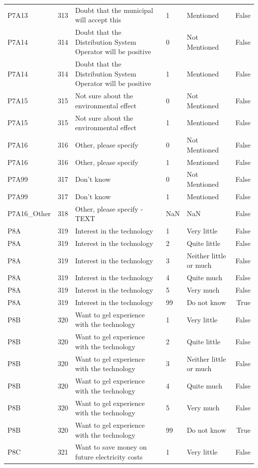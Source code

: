 \begin{tabular}{lrlllr}
P7A13 & 313 & Doubt that the municipal will accept this & 1 & Mentioned & False \\
P7A14 & 314 & Doubt that the Distribution System Operator will be positive & 0 & Not Mentioned & False \\
P7A14 & 314 & Doubt that the Distribution System Operator will be positive & 1 & Mentioned & False \\
P7A15 & 315 & Not sure about the environmental effect & 0 & Not Mentioned & False \\
P7A15 & 315 & Not sure about the environmental effect & 1 & Mentioned & False \\
P7A16 & 316 & Other, please specify & 0 & Not Mentioned & False \\
P7A16 & 316 & Other, please specify & 1 & Mentioned & False \\
P7A99 & 317 & Don’t know & 0 & Not Mentioned & False \\
P7A99 & 317 & Don’t know & 1 & Mentioned & False \\
P7A16_Other & 318 & Other, please specify - TEXT & NaN & NaN & False \\
P8A & 319 & Interest in the technology & 1 & Very little & False \\
P8A & 319 & Interest in the technology & 2 & Quite little & False \\
P8A & 319 & Interest in the technology & 3 & Neither little or much & False \\
P8A & 319 & Interest in the technology & 4 & Quite much & False \\
P8A & 319 & Interest in the technology & 5 & Very much & False \\
P8A & 319 & Interest in the technology & 99 & Do not know & True \\
P8B & 320 & Want to gel experience with the technology & 1 & Very little & False \\
P8B & 320 & Want to gel experience with the technology & 2 & Quite little & False \\
P8B & 320 & Want to gel experience with the technology & 3 & Neither little or much & False \\
P8B & 320 & Want to gel experience with the technology & 4 & Quite much & False \\
P8B & 320 & Want to gel experience with the technology & 5 & Very much & False \\
P8B & 320 & Want to gel experience with the technology & 99 & Do not know & True \\
P8C & 321 & Want to save money on future electricity costs & 1 & Very little & False \\

\end{tabular}
